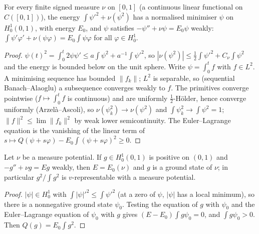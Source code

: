 \begin{theorem}
  \label{thm:line_measure_gs}
  \leanok
  For every finite signed measure $\nu$ on $[0,1]$ (a continuous linear functional on $C([0,1])$), the energy
  $\int\psi'^2+\nu(\psi^2)$ has a normalised minimiser $\psi$ on $H^1_0(0,1)$, with energy $E_0$, and $\psi$ satisfies
  $-\psi''+\nu\psi=E_0\psi$ weakly: $\int\psi'\varphi'+\nu(\psi\varphi)=E_0\int\psi\varphi$ for all $\varphi\in H^1_0$.
\end{theorem}
\begin{proof}
  \leanok
  $\psi(t)^2=\int_0^t2\psi\psi'\le a\int\psi^2+a^{-1}\int\psi'^2$, so $|\nu(\psi^2)|\le\frac12\int\psi'^2+C_\nu\int\psi^2$ and the energy is
  bounded below on the unit sphere. Write $\psi=\int_0^tf$ with $f\in L^2$. A minimising sequence has bounded $\|f_k\|$;
  $L^2$ is separable, so (sequential Banach--Alaoglu) a subsequence converges weakly to $f$. The primitives converge
  pointwise ($f\mapsto\int_0^tf$ is continuous) and are uniformly $\frac12$-H\"older, hence converge uniformly
  (Arzel\`a--Ascoli), so $\nu(\psi_k^2)\to\nu(\psi^2)$ and $\int\psi_k^2\to\int\psi^2=1$; $\|f\|^2\le\lim\|f_k\|^2$ by weak lower
  semicontinuity. The Euler--Lagrange equation is the vanishing of the linear term of
  $s\mapsto Q(\psi+s\varphi)-E_0\int(\psi+s\varphi)^2\ge0$.
\end{proof}

\begin{theorem}
  \label{thm:line_measure_pos}
  \leanok
  Let $\nu$ be a measure potential. If $g\in H^1_0(0,1)$ is positive on $(0,1)$ and $-g''+\nu g=Eg$ weakly, then
  $E=E_0(\nu)$ and $g$ is a ground state of $\nu$; in particular $g^2/\int g^2$ is $v$-representable with a measure potential.
\end{theorem}
\begin{proof}
  \leanok
  $|\psi|\in H^1_0$ with $\int|\psi|'^2\le\int\psi'^2$ (at a zero of $\psi$, $|\psi|$ has a local minimum), so there is a nonnegative
  ground state $\psi_0$. Testing the equation of $g$ with $\psi_0$ and the Euler--Lagrange equation of $\psi_0$ with $g$ gives
  $(E-E_0)\int g\psi_0=0$, and $\int g\psi_0>0$. Then $Q(g)=E_0\int g^2$.
\end{proof}


